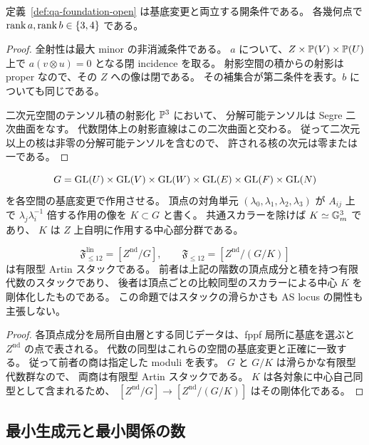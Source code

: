 \begin{lemma}
\label{lem:qa-foundation-open-ranks}
定義~\ref{def:qa-foundation-open} は基底変更と両立する開条件である。
各幾何点で \(\operatorname{rank} a,\operatorname{rank} b\in\{3,4\}\) である。
\end{lemma}
\begin{proof}
全射性は最大 minor の非消滅条件である。
\(a\) について、\(Z\times\mathbb P(V)\times\mathbb P(U)\) 上で
\(a(v\otimes u)=0\) となる閉 incidence を取る。
射影空間の積からの射影は proper なので、その \(Z\) への像は閉である。
その補集合が第二条件を表す。\(b\) についても同じである。

二次元空間のテンソル積の射影化 \(\mathbb P^3\) において、
分解可能テンソルは Segre 二次曲面をなす。
代数閉体上の射影直線はこの二次曲面と交わる。
従って二次元以上の核は非零の分解可能テンソルを含むので、
許される核の次元は零または一である。
\end{proof}

\[
 G=\operatorname{GL}(U)\times\operatorname{GL}(V)\times\operatorname{GL}(W)
       \times\operatorname{GL}(E)\times\operatorname{GL}(F)\times\operatorname{GL}(N)
\]
を各空間の基底変更で作用させる。
頂点の対角単元 \((\lambda_0,\lambda_1,\lambda_2,\lambda_3)\)
が \(A_{ij}\) 上で \(\lambda_j\lambda_i^{-1}\) 倍する作用の像を
\(K\subset G\) と書く。
共通スカラーを除けば \(K\simeq\mathbb G_m^3\) であり、
\(K\) は \(Z\) 上自明に作用する中心部分群である。

\begin{proposition}[有限代数の代数スタック]
\label{prop:qa-foundation-stack}
\[
 \mathfrak F^{\mathrm{lin}}_{\le12}=[Z^{\mathrm{nd}}/G],
 \qquad
 \mathfrak F_{\le12}=[Z^{\mathrm{nd}}/(G/K)]
\]
は有限型 Artin スタックである。
前者は上記の階数の頂点成分と積を持つ有限代数のスタックであり、
後者は頂点ごとの比較同型のスカラーによる中心 \(K\) を剛体化したものである。
この命題ではスタックの滑らかさも AS locus の開性も主張しない。
\end{proposition}
\begin{proof}
各頂点成分を局所自由層とする同じデータは、fppf 局所に基底を選ぶと
\(Z^{\mathrm{nd}}\) の点で表される。
代数の同型はこれらの空間の基底変更と正確に一致する。
従って前者の商は指定した moduli を表す。
\(G\) と \(G/K\) は滑らかな有限型代数群なので、
両商は有限型 Artin スタックである。
\(K\) は各対象に中心自己同型として含まれるため、
\([Z^{\mathrm{nd}}/G]\to[Z^{\mathrm{nd}}/(G/K)]\) はその剛体化である。
\end{proof}

\subsection{最小生成元と最小関係の数}

